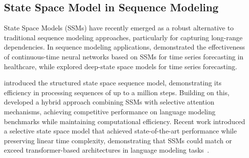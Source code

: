 


\subsection{State Space Model in Sequence Modeling}
State Space Models (SSMs) have recently emerged as a robust alternative to traditional sequence modeling approaches, particularly for capturing long-range dependencies. 
In sequence modeling applications, \citet{hasani2021liquid} demonstrated the effectiveness of continuous-time neural networks based on SSMs for time series forecasting in healthcare, while \citet{rangapuram2018deep} explored deep-state space models for time series forecasting.

\citet{gu2022efficiently} introduced the structured state space sequence model, demonstrating its efficiency in processing sequences of up to a million steps.
Building on this, \citet{dao2022flashattention} developed a hybrid approach combining SSMs with selective attention mechanisms, achieving competitive performance on language modeling benchmarks while maintaining computational efficiency.
Recent work introduced a selective state space model that achieved state-of-the-art performance while preserving linear time complexity, demonstrating that SSMs could match or exceed transformer-based architectures in language modeling tasks~\citep{mamba,mamba2}. 

